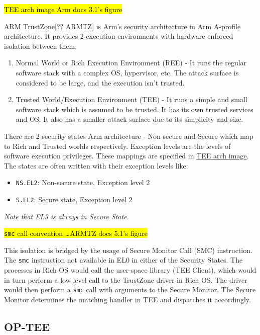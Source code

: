 \documentclass[a4paper, nobind]{templates/ociamthesis}
\providecommand{\tightlist}{%
  \setlength{\itemsep}{0pt}\setlength{\parskip}{0pt}}
\begin{document}
\hl{TEE arch image Arm docs 3.1's figure}

ARM TrustZone{[}?? ARMTZ{]} is Arm's security architecture in Arm A-profile architecture.
It provides 2 execution environments with hardware enforced isolation between them:

\begin{enumerate}
\def\labelenumi{\arabic{enumi}.}
\tightlist
\item
  Normal World or Rich Execution Environment (REE) - It runs the regular software
  stack with a complex OS, hypervisor, etc. The attack surface is considered to be large,
  and the execution isn't trusted.
\item
  Trusted World/Execution Environment (TEE) - It runs a simple and small software
  stack which is assumed to be trusted. It has its own trusted services and OS.
  It also has a smaller attack surface due to its simplicity and size.
\end{enumerate}

There are 2 security states Arm architecture - Non-secure and Secure which map
to Rich and Trusted worlds respectively.
Exception levels are the levels of software execution privileges.
These mappings are specified in \href{}{TEE arch image}.
The states are often written with their exception levels like:

\begin{itemize}
\tightlist
\item
  \texttt{NS.EL2}: Non-secure state, Exception level 2
\item
  \texttt{S.EL2}: Secure state, Exception level 2
\end{itemize}

\emph{Note that EL3 is always in Secure State.}

\hl{\texttt{smc} call convention \ldots ARMTZ docs 5.1's figure}

This isolation is bridged by the usage of Secure Monitor Call (SMC) instruction.
The \texttt{smc} instruction not available in EL0 in either of the Security States.
The processes in Rich OS would call the user-space library (TEE Client),
which would in turn perform a low level call to the TrustZone driver in Rich OS.
The driver would then perform a \texttt{smc} call with arguments to the Secure Monitor.
The Secure Monitor determines the matching handler in TEE and dispatches it accordingly.

\subsection{OP-TEE}\label{op-tee}
\end{document}
